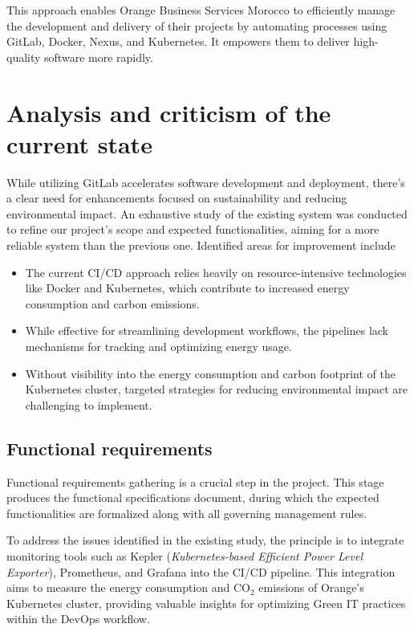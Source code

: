 This approach enables Orange Business Services Morocco to efficiently manage the development and delivery of their projects by automating processes using GitLab, Docker, Nexus, and Kubernetes. It empowers them to deliver high-quality software more rapidly.

\newpage
\section{Analysis and criticism of the current state}

While utilizing GitLab accelerates software development and deployment, there's a clear need for enhancements focused on sustainability and reducing environmental impact. An exhaustive study of the existing system was conducted to refine our project's scope and expected functionalities, aiming for a more reliable system than the previous one. Identified areas for improvement include

\begin{itemize}
  \item The current CI/CD approach relies heavily on resource-intensive technologies like Docker and Kubernetes, which contribute to increased energy consumption and carbon emissions.
  \item While effective for streamlining development workflows, the pipelines lack mechanisms for tracking and optimizing energy usage.
  \item Without visibility into the energy consumption and carbon footprint of the Kubernetes cluster, targeted strategies for reducing environmental impact are challenging to implement.
\end{itemize}

\subsection{Functional requirements}
Functional requirements gathering is a crucial step in the project. This stage produces the functional specifications document, during which the expected functionalities are formalized along with all governing management rules.

To address the issues identified in the existing study, the principle is to integrate monitoring tools such as Kepler (\emph{Kubernetes-based Efficient Power Level Exporter}), Prometheus, and Grafana into the CI/CD pipeline. This integration aims to measure the energy consumption and CO$_2$ emissions of Orange’s Kubernetes cluster, providing valuable insights for optimizing Green IT practices within the DevOps workflow.


